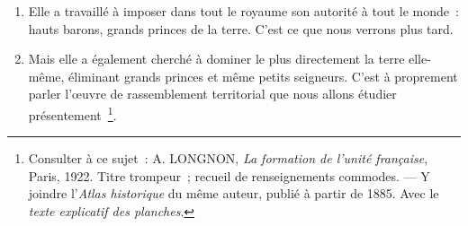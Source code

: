 \documentclass[french,twoside]{book} %
\begin{document}
\begin{enumerate}[itemsep=0pt,]
\item Elle a travaillé à imposer dans tout le royaume son autorité à tout le monde : hauts barons, grands princes de la terre. C’est ce que nous verrons plus tard.
\item Mais elle a également cherché à dominer le plus directement la terre elle-même, éliminant grands princes et même petits seigneurs. C’est à proprement parler l’œuvre de rassemblement territorial que nous allons étudier présentement \footnote{ Consulter à ce sujet : A. LONGNON, {\itshape La formation de l’unité française}, Paris, 1922. Titre trompeur ; recueil de renseignements commodes. — Y joindre l’{\itshape Atlas historique} du même auteur, publié à partir de 1885. Avec le \emph{texte explicatif des planches}.}.
\end{enumerate}
\end{document}
